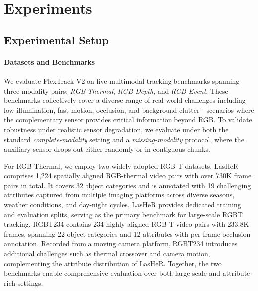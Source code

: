 \section{Experiments}
\label{sec:experiments}

\subsection{Experimental Setup}
\label{subsec:setup}

\paragraph*{Datasets and Benchmarks}
We evaluate FlexTrack-V2 on five multimodal tracking benchmarks spanning three modality pairs: \emph{RGB-Thermal}, \emph{RGB-Depth}, and \emph{RGB-Event}. These benchmarks collectively cover a diverse range of real-world challenges including low illumination, fast motion, occlusion, and background clutter—scenarios where the complementary sensor provides critical information beyond RGB. To validate robustness under realistic sensor degradation, we evaluate under both the standard \emph{complete-modality} setting and a \emph{missing-modality} protocol, where the auxiliary sensor drops out either randomly or in contiguous chunks.

For RGB-Thermal, we employ two widely adopted RGB-T datasets. LasHeR\cite{li2021lasher} comprises 1,224 spatially aligned RGB-thermal video pairs with over 730K frame pairs in total. It covers 32 object categories and is annotated with 19 challenging attributes captured from multiple imaging platforms across diverse seasons, weather conditions, and day-night cycles. LasHeR provides dedicated training and evaluation splits, serving as the primary benchmark for large-scale RGBT tracking. RGBT234\cite{rgbt234} contains 234 highly aligned RGB-T video pairs with 233.8K frames, spanning 22 object categories and 12 attributes with per-frame occlusion annotation. Recorded from a moving camera platform, RGBT234 introduces additional challenges such as thermal crossover and camera motion, complementing the attribute distribution of LasHeR. Together, the two benchmarks enable comprehensive evaluation over both large-scale and attribute-rich settings.
    
